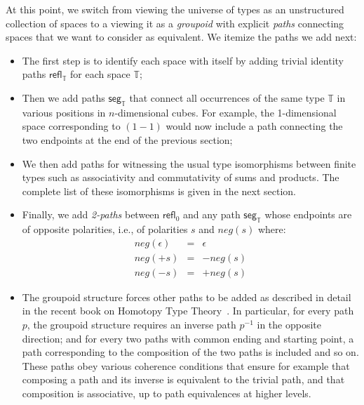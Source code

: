 \documentclass[authoryear,preprint]{sigplanconf}
\newcommand{\refl}[1]{\textsf{refl}_{#1}}
\newcommand{\seg}[1]{\textsf{seg}_{#1}}
\newcommand{\negp}[1]{\textit{neg}(#1)}
\newcommand{\cubt}{\mathbb{T}}
\begin{document}
At this point, we switch from viewing the universe of types as an
unstructured collection of spaces to a viewing it as a \emph{groupoid} with
explicit \emph{paths} connecting spaces that we want to consider as
equivalent. We itemize the paths we add next:
\begin{itemize}
\item The first step is to identify each space with itself by adding trivial
  identity paths $\refl{\cubt}$ for each space $\cubt$;
\item Then we add paths $\seg{\cubt}$ that connect all occurrences of the
  same type $\cubt$ in various positions in $n$-dimensional cubes. For
  example, the 1-dimensional space corresponding to $(1-1)$ would now include
  a path connecting the two endpoints at the end of the previous section;
\item We then add paths for witnessing the usual type isomorphisms between
  finite types such as associativity and commutativity of sums and
  products. The complete list of these isomorphisms is given in the next
  section.
\item Finally, we add \emph{2-paths} between $\refl{0}$ and any path
  $\seg{\cubt}$ whose endpoints are of opposite polarities, i.e., of
  polarities $s$ and $\negp{s}$ where:
  \[\begin{array}{rcl}
  \negp{\epsilon} &=& \epsilon \\
  \negp{+s} &=& -\negp{s} \\
  \negp{-s} &=& +\negp{s}
  \end{array}\]
\item The groupoid structure forces other paths to be added as described in
  detail in the recent book on Homotopy Type Theory~\cite{hottbook}. In
  particular, for every path $p$, the groupoid structure requires an inverse
  path $p^{-1}$ in the opposite direction; and for every two paths with
  common ending and starting point, a path corresponding to the composition
  of the two paths is included and so on. These paths obey various coherence
  conditions that ensure for example that composing a path and its inverse is
  equivalent to the trivial path, and that composition is associative, up to
  path equivalences at higher levels.
\end{itemize}
\end{document}
